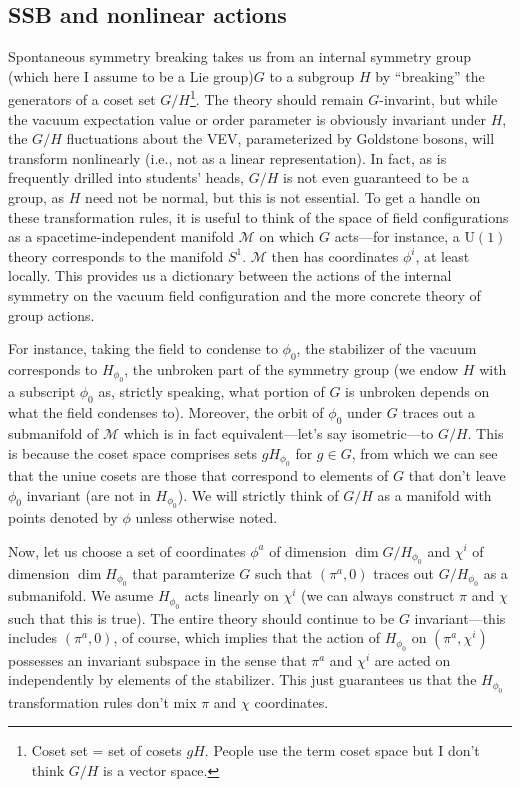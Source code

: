 \documentclass{report}
\begin{document}
\subsection{SSB and nonlinear actions}
Spontaneous symmetry breaking takes us from an internal symmetry group (which here 
I assume to be a Lie group)$ G $ to a subgroup $ H $ by ``breaking'' the
generators of a coset set $ G/H $\footnote{Coset set = set of cosets $ gH $. People 
use the term coset space but I don't think $ G/H $ is a vector space.}. The
theory should remain $ G $-invarint, but while the vacuum expectation value or
order parameter is obviously invariant under $ H $, the $ G/H $ fluctuations
about the VEV, parameterized by Goldstone bosons, will transform nonlinearly
(i.e., not as a linear representation). In fact, as is frequently drilled into
students' heads, $ G/H $ is not even guaranteed to be a group, as $ H $ need not
be normal, but this is not essential. To get a handle on these transformation
rules, it is useful to think of the space of field configurations as a
spacetime-independent manifold $ \mathcal{M} $ on which $ G $ acts---for
instance, a $ \text{U}(1) $ theory corresponds to the manifold $ S^1 $. $
\mathcal{M} $ then has coordinates $ \phi^i $, at least locally. This provides
us a dictionary between the actions of the internal symmetry on the vacuum field
configuration and the more concrete theory of group actions. 

For instance, taking the field to condense to $ \phi_0 $, the stabilizer of the
vacuum corresponds to $ H_{\phi_0} $, the unbroken part of the symmetry group
(we endow $ H $ with a subscript $ \phi_0 $ as, strictly speaking, what portion of
$ G $ is unbroken depends on what the field condenses to). Moreover, the orbit
of $ \phi_0 $ under $ G $ traces out a submanifold of $ \mathcal{M} $ which is
in fact equivalent---let's say isometric---to $ G/H $. This is because the 
coset space comprises sets $ gH_{\phi_0} $ for $ g\in G $, from which we can see 
that the uniue cosets are those that correspond to elements of $ G $ that don't 
leave $ \phi_0 $ invariant (are not in $ H_{\phi_0} $). We will strictly think 
of $ G/H $ as a manifold with points denoted by $ \phi $ unless otherwise noted.

Now, let us choose a set of coordinates $ \phi^a $ of dimension $ \dim G/H_{\phi_0} $
and  $ \chi^i $ of dimension $ \dim H_{\phi_0} $ that paramterize $ G $ such that 
$ (\pi^a, 0) $ traces out $ G/H_{\phi_0} $ as a submanifold. We asume $
H_{\phi_0} $ acts linearly on $ \chi^i $ (we can always construct $ \pi $ and
$ \chi $ such that this is true). The entire theory should continue to be 
$ G $ invariant---this includes $ (\pi^a, 0) $, of course, which implies that 
the action of $ H_{\phi_0} $ on $ (\pi^a,\chi^i) $ possesses an invariant
subspace in the sense that $ \pi^a $ and $ \chi^i $ are acted on independently
by elements of the stabilizer. This just guarantees us that the $ H_{\phi_0} $
transformation rules don't mix $ \pi $ and $ \chi $ coordinates.
\end{document}
